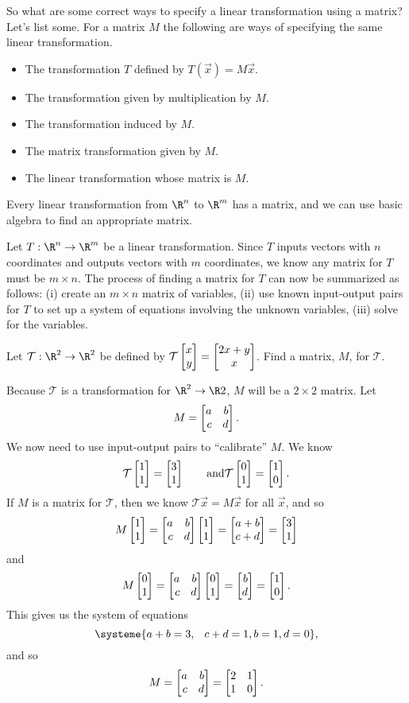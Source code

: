So what are some correct ways to specify a linear transformation using a matrix? Let's list some.
For a matrix $M$ the following are ways of specifying the same linear transformation.
\begin{itemize}
	\item The transformation $T$ defined by $T(\vec x)=M\vec x$.
	\item The transformation given by multiplication by $M$.
	\item The transformation induced by $M$.
	\item The matrix transformation given by $M$.
	\item The linear transformation whose matrix is $M$.
\end{itemize}


Every linear transformation from $\R^n$ to $\R^m$ has a matrix, and we can use basic algebra to find
an appropriate matrix.

Let $T:\R^n\to\R^m$ be a linear transformation. Since $T$ inputs vectors with $n$ coordinates and outputs
vectors with $m$ coordinates, we know any matrix for $T$ must be $m\times n$. The process of finding
a matrix for $T$ can now be summarized as follows: (i) create an $m\times n$ matrix of variables, (ii) use
known input-output pairs for $T$ to set up a system of equations involving the unknown variables, (iii) solve
for the variables.

\begin{example}
	Let $\mathcal T:\R^2\to\R^2$ be defined by $\mathcal T\mat{x\\y}=\matc{2x+y\\x}$. Find a matrix, $M$, for $\mathcal T$.

	Because $\mathcal T$ is a transformation for $\R^2\to\R2$, $M$ will be a $2\times 2$ matrix. Let
	\[
		M=\mat{a&b\\c&d}.
	\]
	We now need to use input-output pairs to ``calibrate'' $M$. We know
	\[
		\mathcal T\mat{1\\1}=\mat{3\\1}\qquad\text{and}\mathcal T\mat{0\\1}=\mat{1\\0}.
	\]
	If $M$ is a matrix for $\mathcal T$, then we know $\mathcal T\vec x=M\vec x$ for all $\vec x$, and so
	\[
		M\mat{1\\1}=\mat{a&b\\c&d}\mat{1\\1}=\mat{a+b\\c+d}=\mat{3\\1}
	\]
	and
	\[
		M\mat{0\\1}=\mat{a&b\\c&d}\mat{0\\1}=\mat{b\\d}=\mat{1\\0}.
	\]
	This gives us the system of equations
	\[
		\systeme{a+b=3,\phantom{+}c+d=1,b=1,d=0},
	\]
	and so
	\[
		M=\mat{a&b\\c&d} = \mat{2&1\\1&0}.
	\]
\end{example}

	

